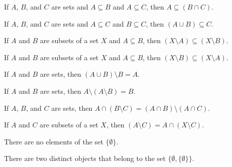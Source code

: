 	\ba
	\item If $A$, $B$, and $C$ are sets and $A \subseteq B$ and $A \subseteq C$, then $A \subseteq (B \cap C)$. 

	\item If $A$, $B$, and $C$ are sets and $A \subseteq C$ and $B \subseteq C$, then $(A \cup B) \subseteq C$.

	\item If $A$ and $B$ are subsets of a set $X$ and $A \subseteq B$, then $(X \setminus A) \subseteq (X \setminus B)$. 
	
	\item If $A$ and $B$ are subsets of a set $X$ and $A \subseteq B$, then $(X \setminus B) \subseteq (X \setminus A)$. 

	\item If $A$ and $B$ are sets, then $(A \cup B) \setminus B = A$. 

	\item If $A$ and $B$ are sets, then $A \setminus (A \setminus B) = B$. 
	
	\item If $A$, $B$, and $C$ are sets, then $A \cap (B \setminus C) = (A \cap B) \setminus (A \cap C)$. 
	
	\item If $A$ and $C$ are subsets of a set $X$, then $(A \setminus C) = A \cap (X \setminus C)$. 
	
	\item There are no elements of the set $\{\emptyset\}$.

	\item There are two distinct objects that belong to the set $\{\emptyset, \{\emptyset\}\}$. 
		
	\ea

